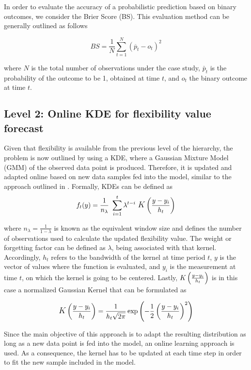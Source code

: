 In order to evaluate the accuracy of a probabilistic prediction based on binary outcomes, we consider the Brier Score (BS). This evaluation method can be generally outlined as follows

\begin{equation}
    BS = \frac{1}{N} \sum_{t=1}^{N} (\overline{p}_{t} - o_{t})^2
\end{equation}


where $N$ is the total number of observations under the case study, $\bar{p}_{t}$ is the probability of the outcome to be 1, obtained at time $t$, and $o_{t}$ the binary outcome at time $t$.
\subsection{Level 2: Online KDE for flexibility value forecast}
Given that flexibility is available from the previous level of the hierarchy, the problem is now outlined by using a KDE, where a Gaussian Mixture Model (GMM) \cite{Silverman1986} of the observed data point is produced. Therefore, it is updated and adapted online based on new data samples fed into the model, similar to the approach outlined in \cite{Kristan2010,Pinson2012}. Formally, KDEs can be defined as
\begin{equation}
    f_{t}(y)= \frac{1}{n_{\lambda}} \ \sum_{i=1}^{t} \lambda^{t-i} \ \mathlarger{K}\left(\frac{y - y_{i}}{h_{t}}\right) 
\end{equation}

where $n_{\lambda} = \frac{1}{1-\lambda}$ is known as the equivalent window size and defines the number of observations used to calculate the updated flexibility value. The weight or forgetting factor can be defined as $\lambda$, being associated with that kernel. Accordingly, $h_{t}$ refers to the bandwidth of the kernel at time period $t$, $y$ is the vector of values where the function is evaluated, and $y_{i}$ is the measurement at time $t$, on which the kernel is going to be centered. Lastly, $\mathlarger{K}\left(\frac{y - y_{i}}{h_{t}}\right)$ is in this case a normalized Gaussian Kernel that can be formulated as

\begin{equation}
 \mathlarger{K}\left(\frac{y - y_{i}}{h_{t}}\right) = \frac{1}{h_{t} \sqrt{2 \pi}} \exp{\left(-\frac{1}{2}\left(\frac{y - y_{i}}{h_{t}}\right)^2\right) }
\end{equation}


Since the main objective of this approach is to adapt the resulting distribution as long as a new data point is fed into the model, an online learning approach is used. As a consequence, the kernel has to be updated at each time step in order to fit the new sample included in the model.


